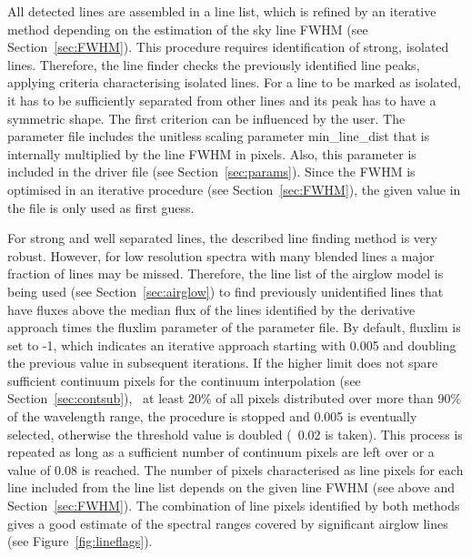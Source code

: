 All detected lines are assembled in a line list, which is refined by an
iterative method depending on the estimation of the sky line FWHM (see
Section~\ref{sec:FWHM}). This procedure requires identification of strong,
isolated lines. Therefore, the line finder checks the previously identified
line peaks, applying criteria characterising isolated lines. For a line to be
marked as isolated, it has to be sufficiently separated from other lines and
its peak has to have a symmetric shape. The first criterion can be influenced
by the user. The parameter file includes the unitless scaling parameter {\sc
min\_line\_dist} that is internally multiplied by the line FWHM in pixels.
Also, this parameter is included in the driver file (see
Section~\ref{sec:params}). Since the FWHM is optimised in an iterative
procedure (see Section~\ref{sec:FWHM}), the given value in the file is only
used as first guess.

For strong and well separated lines, the described line finding method is very
robust. However, for low resolution spectra with many blended lines a major
fraction of lines may be missed. Therefore, the line list of the airglow model
is being used (see Section~\ref{sec:airglow}) to find previously unidentified
lines that have fluxes above the median flux of the lines identified by the
derivative approach times the {\sc fluxlim} parameter of the parameter file. By
default, {\sc fluxlim} is set to -1, which indicates an iterative approach
starting with 0.005 and doubling the previous value in subsequent iterations.
If the higher limit does not spare sufficient continuum pixels for the
continuum interpolation (see Section~\ref{sec:contsub}), \ie\ at least 20\% of
all pixels distributed over more than 90\% of the wavelength range, the
procedure is stopped and 0.005 is eventually selected, otherwise the threshold
value is doubled (\ie\ 0.02 is taken). This process is repeated as long as a
sufficient number of continuum pixels are left over or a value of 0.08 is
reached. The number of pixels characterised as line pixels for each line
included from the line list depends on the given line FWHM (see above and
Section~\ref{sec:FWHM}). The combination of line pixels identified by both
methods gives a good estimate of the spectral ranges covered by significant
airglow lines (see Figure~\ref{fig:lineflags}).

